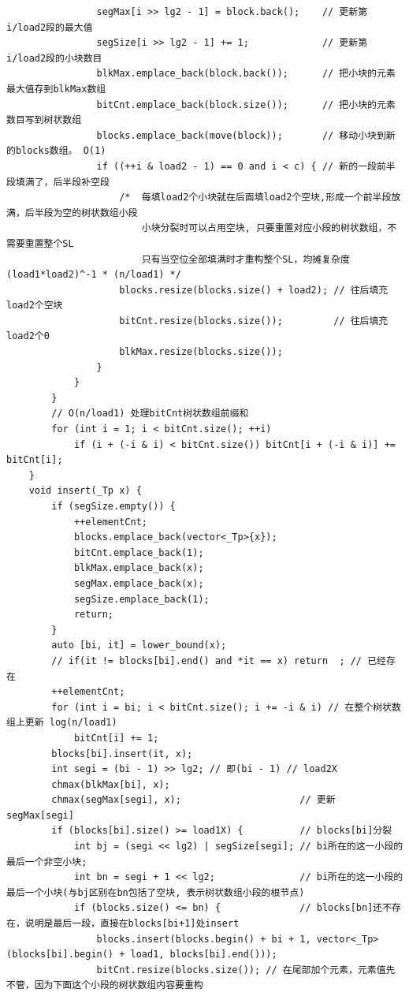 \documentclass[UTF8,twoside]{ctexart}
\begin{document}
\begin{lstlisting}
                segMax[i >> lg2 - 1] = block.back();    // 更新第i/load2段的最大值
                segSize[i >> lg2 - 1] += 1;             // 更新第i/load2段的小块数目
                blkMax.emplace_back(block.back());      // 把小块的元素最大值存到blkMax数组
                bitCnt.emplace_back(block.size());      // 把小块的元素数目写到树状数组
                blocks.emplace_back(move(block));       // 移动小块到新的blocks数组。 O(1)
                if ((++i & load2 - 1) == 0 and i < c) { // 新的一段前半段填满了，后半段补空段
                    /*  每填load2个小块就在后面填load2个空块,形成一个前半段放满，后半段为空的树状数组小段
                        小块分裂时可以占用空块, 只要重置对应小段的树状数组，不需要重置整个SL
                        只有当空位全部填满时才重构整个SL，均摊复杂度(load1*load2)^-1 * (n/load1) */
                    blocks.resize(blocks.size() + load2); // 往后填充load2个空块
                    bitCnt.resize(blocks.size());         // 往后填充load2个0
                    blkMax.resize(blocks.size());
                }
            }
        }
        // O(n/load1) 处理bitCnt树状数组前缀和
        for (int i = 1; i < bitCnt.size(); ++i)
            if (i + (-i & i) < bitCnt.size()) bitCnt[i + (-i & i)] += bitCnt[i];
    }
    void insert(_Tp x) {
        if (segSize.empty()) {
            ++elementCnt;
            blocks.emplace_back(vector<_Tp>{x});
            bitCnt.emplace_back(1);
            blkMax.emplace_back(x);
            segMax.emplace_back(x);
            segSize.emplace_back(1);
            return;
        }
        auto [bi, it] = lower_bound(x);
        // if(it != blocks[bi].end() and *it == x) return  ; // 已经存在
        ++elementCnt;
        for (int i = bi; i < bitCnt.size(); i += -i & i) // 在整个树状数组上更新 log(n/load1)
            bitCnt[i] += 1;
        blocks[bi].insert(it, x);
        int segi = (bi - 1) >> lg2; // 即(bi - 1) // load2X
        chmax(blkMax[bi], x);
        chmax(segMax[segi], x);                     // 更新 segMax[segi]
        if (blocks[bi].size() >= load1X) {          // blocks[bi]分裂
            int bj = (segi << lg2) | segSize[segi]; // bi所在的这一小段的最后一个非空小块;
            int bn = segi + 1 << lg2;               // bi所在的这一小段的最后一个小块(与bj区别在bn包括了空块, 表示树状数组小段的根节点)
            if (blocks.size() <= bn) {              // blocks[bn]还不存在，说明是最后一段，直接在blocks[bi+1]处insert
                blocks.insert(blocks.begin() + bi + 1, vector<_Tp>(blocks[bi].begin() + load1, blocks[bi].end()));
                bitCnt.resize(blocks.size()); // 在尾部加个元素，元素值先不管，因为下面这个小段的树状数组内容要重构

\end{lstlisting}
\end{document}
